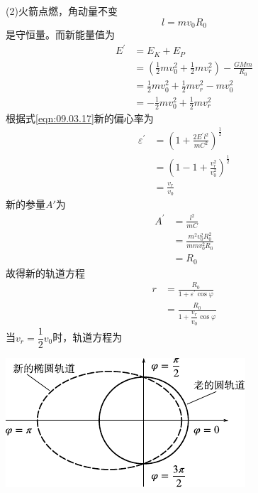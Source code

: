 (2)火箭点燃，角动量不变
\begin{equation*}
  l = m v _ { 0 } R _ { 0 }
\end{equation*}
是守恒量。而新能量值为
\begin{equation*}
  \begin{split}
    E ^ { \prime } &= E _ { K } + E _ { P } \\
    &= \left( \frac { 1 } { 2 } m v _ 0 ^ { 2 } + \frac { 1 } { 2 } m v _ r ^ { 2 } \right) - \frac { G M m } { R _ { 0 } } \\
    &= \frac { 1 } { 2 } m v _ 0 ^ { 2 } + \frac { 1 } { 2 } m v _ r ^ { 2 } - m v _ 0 ^ { 2 } \\
    &= - \frac { 1 } { 2 } m v _ 0 ^ { 2 } + \frac { 1 } { 2 } m v _ r ^ { 2 }
  \end{split}
\end{equation*}
根据式\eqref{eqn:09.03.17}新的偏心率为
\begin{equation*}
  \begin{split}
    \varepsilon ^ { \prime } &= \left( 1 + \frac { 2 E ^ { \prime } l ^ { 2 } } { m C ^ { 2 } } \right) ^ { \frac { 1 } { 2 } } \\
    &= \left( 1 - 1 + \frac { v _ { r } ^ { 2 } } { v _ 0 ^ { 2 } } \right) ^ { \frac { 1 } { 2 } } \\
    &= \frac { v _ { r } } { v _ { 0 } }
  \end{split}
\end{equation*}
新的参量$ A ' $为
\begin{equation*}
  \begin{split}
    A ^ { \prime } &= \frac { l ^ { 2 } } { m C } \\
    &= \frac { m ^ { 2 } v _ 0 ^ { 2 } R _ 0 ^ { 2 } } { m m v _ 0 ^ { 2 } R _ { 0 } } \\
    &= R _ { 0 }
  \end{split}
\end{equation*}
故得新的轨道方程
\begin{equation*}
  \begin{split}
    r &= \frac { R _ { 0 } } { 1 + \varepsilon ^ { \prime } \cos \varphi } \\
    &= \frac { R _ { 0 } } { 1 + \dfrac {  v _ { r } } { v _ { 0 } } \cos \varphi }
  \end{split}
\end{equation*}
当$ v _ { r } = \dfrac { 1 } { 2 } v _ { 0 } $时，轨道方程为
\begin{figurex}
  \centering
  \includegraphics{figure/fig09.08}
  \caption{}
  \label{fig:09.08}
\end{figurex}

